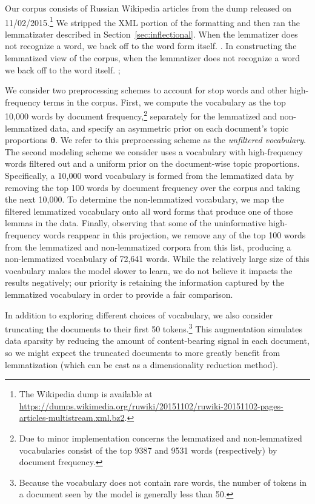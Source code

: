 \documentclass[11pt,letterpaper]{article}
\renewcommand{\vec}{\boldsymbol}   %
\newcommand{\vtheta}{{\vec{\theta}}}
\newcommand{\Note}[3]{\sethlcolor{#2}\hl{[\textbf{#1}: #3]}}
\renewcommand{\Note}[3]{}
\newcommand{\ryan}[1]{\Note{ryan}{lightorange}{#1}}
\newcommand{\todo}[1]{\Note{todo}{red}{#1}}
\begin{document}
{Our corpus consists of Russian Wikipedia articles from the dump
released on 11/02/2015.\footnote{The Wikipedia dump is available at
    \url{https://dumps.wikimedia.org/ruwiki/20151102/ruwiki-20151102-pages-articles-multistream.xml.bz2}.
}
We stripped the XML portion of the formatting and then ran the
lemmatizater described in Section~\ref{sec:inflectional}.  When the
lemmatizer does not recognize a word, we back off to the word form
itself.  \todo{ryan: please give details of data collection,
  lemmatizer}.  In constructing the lemmatized view of the corpus,
when the lemmatizer does not recognize a word we back off to the word
itself.  \todo{give num/frac unknown}; \ryan{How do we get this?}

We consider two preprocessing schemes to account for stop words and
other high-frequency terms in the corpus.  First, we compute the
vocabulary as the top 10,000 words by document frequency,\footnote{
    Due to minor implementation concerns the lemmatized and
    non-lemmatized vocabularies consist of the top 9387 and 9531 words
    (respectively) by document frequency.
}
separately for the lemmatized and non-lemmatized data, and
specify an asymmetric prior on each document's topic proportions
$\vtheta$.
We refer to this preprocessing scheme
as the \emph{unfiltered vocabulary}.  The second modeling scheme we
consider uses a vocabulary with high-frequency words filtered out and a
uniform prior on the document-wise topic proportions.
Specifically, a 10,000 word vocabulary is formed from the
lemmatized data by removing the top 100 words by document frequency
over the corpus and taking the next 10,000.  To determine the
non-lemmatized vocabulary, we map the filtered lemmatized
vocabulary onto all word forms that produce one of those lemmas in
the data.  Finally, observing that some of the uninformative
high-frequency words reappear in this projection, we remove any
of the top 100 words from the lemmatized and non-lemmatized corpora
from this list, producing a non-lemmatized vocabulary of 72,641 words.
While the relatively large size of this vocabulary makes the model
slower to learn, we do not believe it impacts the results negatively;
our priority is retaining the information captured by the lemmatized
vocabulary in order to provide a fair comparison.

In addition to exploring different choices of vocabulary, we also
consider truncating the documents to their first 50 tokens.\footnote{
    Because the vocabulary does not contain rare words, the number of
    tokens in a document seen by the model is generally less than 50.
}
This augmentation simulates data sparsity by reducing the amount of
content-bearing signal in each document, so we might expect the
truncated documents to more greatly benefit from lemmatization (which
can be cast as a dimensionality reduction method).

}
\end{document}
